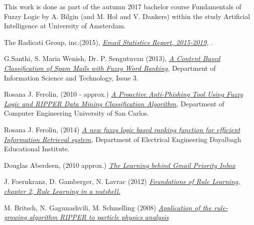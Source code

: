 \documentclass[journal]{IEEEtran}
\begin{document}
This work is done as part of the autumn 2017 bachelor course Fundamentals of Fuzzy Logic by A. Bilgin (and  M. Hol and V. Dankers) within the study Artificial Intelligence at University of Amsterdam.

\begin{thebibliography}{9}
    The Radicati Group, inc.(2015),
    \textit{
        \href{https://github.com/Menziess/Fuzzy-Logic-Email-Classification/raw/master/report/res/a_new_fuzzy_logic_based_ranking_function_for_efficient_information_retrieval_system.pdf}{Email Statistics Report, 2015-2019},
    }.

    G.Santhi, S. Maria Wenish, Dr. P. Sengutuvan (2013),
    \textit{
        \href{https://github.com/Menziess/Fuzzy-Logic-Email-Classification/raw/master/report/res/a_content_based_classification_of_spam_mails_with_fuzzy_word_ranking.pdf}{A Content Based Classification of Spam Mails with Fuzzy Word Ranking},
    }
    Department of Information Science and Technology,
    Issue 3.

    Rosana J. Ferolin, (2010 - approx.)
    \textit{
        \href{https://github.com/Menziess/Fuzzy-Logic-Email-Classification/raw/master/report/res/a_proactive_anti-phishing_tool_using_fuzzy_logic_and_ripper_data_mining_classification_algorithm.pdf}{A Proactive Anti-Phishing Tool Using Fuzzy Logic and RIPPER Data Mining Classification Algorithm},
    }
    Department of Computer Engineering University of San Carlos.

    Rosana J. Ferolin, (2014)
    \textit{
        \href{https://github.com/Menziess/Fuzzy-Logic-Email-Classification/raw/master/report/res/a_new_fuzzy_logic_based_ranking_function_for_efficient_information_retrieval_system.pdf}{A new fuzzy logic based ranking function for efficient Information Retrieval system},
    }
    Department of Electrical Engineering Dayalbagh Educational Institute.

    Douglas Aberdeen, (2010 approx.)
    \textit{
        \href{[nog toevoegen}{The Learning behind Gmail Priority Inbox}
    }

    J. Foernkranz, D. Gamberger, N. Lavrac (2012)
    \textit{
        \href{[nog toevoegen}{Foundations of Rule Learning, chapter 2, Rule Learning in a nutshell.}
    }

    M. Britsch, N. Gagunashvili, M. Schmelling (2008)
    \textit{
        \href{[nog toevoegen}{Application of the rule-growing algorithm RIPPER to particle physics analysis}
    }

\end{thebibliography}
\end{document}
